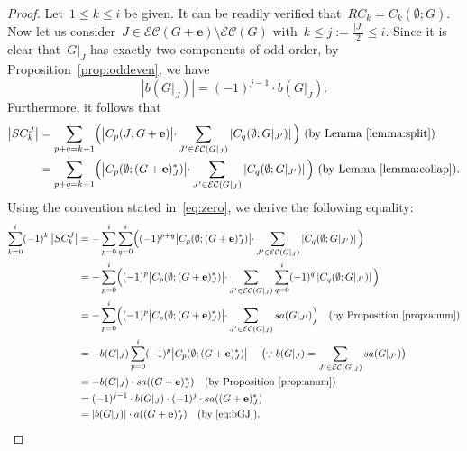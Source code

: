 \documentclass[10pt]{amsart}
\theoremstyle{plain}
\numberwithin{equation}{section}
\theoremstyle{definition}
\newcommand{\edge}{\mathbf{e}}
\newcommand{\EC}{\mathcal{E}\mathcal{C}}
\begin{document}
\begin{proof}
    Let~$1 \leq k \leq i$ be given. 
    It can be readily verified that~$RC_k= C_k(\emptyset;G)$.
    Now let us consider~$J \in \EC(G+\edge)\setminus \EC(G)$ with~$k \leq j := \frac{\left\vert J \right\vert}{2} \leq i$.
    Since it is clear that~$G\vert_J$ has exactly two components of odd order, by Proposition~\ref{prop:oddeven}, we have
    \begin{equation}\label{eq:bGJ}
      \left\vert b(G\vert_J) \right\vert = (-1)^{j-1} \cdot b(G\vert_J).
    \end{equation}
    Furthermore, it follows that
    \begin{align*}
      \left\vert SC^J_k \right\vert & =  \sum_{p+q = k-1}\Bigl(\bigl| C_p(J; G + \edge) \bigl| \cdot \sum_{J' \in \EC(G\vert_J)}\left\vert C_q(\emptyset; G\vert_{J'})\right\vert\Bigl) \text{ (by Lemma~\ref{lemma:split})} \\
       & = \sum_{p+q = k-1}\Bigl(\bigl| C_p(\emptyset; (G + \edge)^\ast_J) \bigl| \cdot \sum_{J' \in \EC(G\vert_J)}\left\vert C_q(\emptyset; G\vert_{J'})\right\vert\Bigl) \text{ (by Lemma~\ref{lemma:collap})}.
    \end{align*}
    Using the convention stated in~\eqref{eq:zero}, we derive the following equality:
    \begin{align*}
     \sum_{k=0}^{i}(-1)^{k}\left\vert SC^J_k\right\vert & = -\sum_{p=0}^{i}\sum_{q=0}^{i}\Bigl((-1)^{p+q}\bigl| C_p(\emptyset; (G + \edge)^\ast_J) \bigl| \cdot \sum_{J' \in \EC(G\vert_J)} \left\vert C_q(\emptyset; G\vert_{J'})\right\vert\Bigl) \\ 
       & = -\sum_{p=0}^{i}\Bigl((-1)^p\bigl| C_p(\emptyset; (G + \edge)^\ast_J) \bigl| \cdot \sum_{J' \in \EC(G\vert_J)} \sum_{q=0}^{i}(-1)^q\left\vert C_q(\emptyset; G\vert_{J'})\right\vert\Bigl) \\
       & = -\sum_{p=0}^{i}\Bigl((-1)^p\bigl| C_p(\emptyset; (G + \edge)^\ast_J) \bigl| \cdot \sum_{J' \in \EC(G\vert_J)} sa(G\vert_{J'})\Bigl) \quad \text{(by Proposition~\ref{prop:anum})}\\
       & = -b(G\vert_J)\sum_{p=0}^{i}(-1)^p\bigl| C_p(\emptyset; (G + \edge)^\ast_J) \bigl| \ \quad \bigl(\because b(G\vert_J) = \sum_{J' \in \EC(G\vert_J)} sa(G\vert_{J'})\bigl)\\
       &= -b(G\vert_J) \cdot sa((G + \edge)^\ast_J) \quad \text{(by Proposition~\ref{prop:anum})}\\
       &= (-1)^{j-1} \cdot b(G\vert_J) \cdot (-1)^{j} \cdot sa((G + \edge)^\ast_J) \\
       &= \left\vert b(G\vert_J) \right\vert \cdot a((G + \edge)^\ast_J) \quad \text{(by \eqref{eq:bGJ})}.

\end{align*}
\end{proof}
\end{document}
